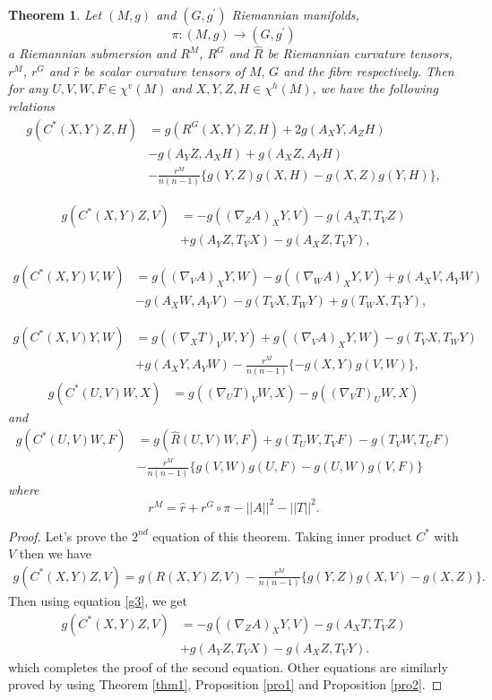 \documentclass{birkjour}
\newtheorem{theorem}{Theorem}[section]
\theoremstyle{definition}
\theoremstyle{remark}
\numberwithin{equation}{section}
\begin{document}
\begin{theorem}
	Let $(M, g)$ and $(G, g^\prime)$ Riemannian manifolds,
	$$\pi: (M, g) \to(G, g^\prime)$$
	a Riemannian submersion and $R^M$, $R^G$ and  $\hat{R}$ be Riemannian curvature tensors, $r^M$, $r^G$ and  $\hat{r}$ be scalar curvature tensors of $M, \, G$ and the fibre respectively. Then for any $U, V, W, F \in \chi^v (M)$ and $X, Y, Z, H\in  \chi^h (M)$, we have the following relations
	\begin{align*}
		g(C^*(X,Y)Z, H) &=  g(R^G (X,Y) Z , H )+ 2g (A_{X}Y, A_{Z}H )\\
		&- g (A_{Y}Z, A_{X}H )+ g (A_{X}Z, A_{Y}H )\\
		&- \frac{r^M}{n(n-1)} \Bigg\{ g(Y,Z) g(X,H)- g(X,Z) g(Y,H) \Bigg\},
	\end{align*}
	
	\begin{align*}
		g(C^*(X,Y)Z, V) &= -g((\nabla_Z A)_X Y, V) - g(A_X T, T_V Z) \\
		&+ g(A_Y Z, T_V X) - g(A_X Z, T_V Y),
	\end{align*}
	
	\begin{align*}
		g(C^*(X,Y)V, W) &= g((\nabla_V A)_X Y, W) - g((\nabla_W A)_X Y, V) + g(A_X V, A_Y W) \\
		&- g(A_X W, A_Y V)-g(T_V X, T_W Y)+ g(T_W X, T_V Y),
	\end{align*}
	
	\begin{align*}
		g(C^*(X,V)Y, W) &= g((\nabla_X T)_V W, Y) + g((\nabla_V A)_X Y, W)
		- g(T_V X, T_W Y) \\
		&+ g(A_X Y, A_Y W)-\frac{r^M}{n(n-1)} \{-g(X,Y)g(V,W)\},
	\end{align*}
	\begin{align*}
		g(C^*(U,V)W, X) &= g((\nabla_U T)_V W, X) - g((\nabla_V T)_U W, X)
	\end{align*}
	and
	\begin{align*}
		g(C^*(U,V)W, F)&= g( \hat{R} (U,V)W , F)+ g (T_{U}W, T_{V}F )- g (T_{V}W, T_{U}F) \\
		&- \frac{r^M}{n(n-1)} \Bigg\{ g(V,W)g(U,F)- g(U,W)g(V,F)\Bigg\}
	\end{align*}
	where
	\begin{equation*}
	r^M= \hat{r}+r^G \circ \pi -||A||^2- ||T||^2.
	\end{equation*}
\end{theorem}
\begin{proof}
	Let's prove the $2^{nd}$ equation of this theorem. Taking inner product $C^*$ with $V$ then we have
	\begin{align*}
		g(C^*(X,Y)Z,V) = g(R(X,Y)Z,V) -\frac{r^M}{n(n-1)} \{g(Y,Z)g(X,V)-g(X,Z)\}.
	\end{align*}
	Then using equation \eqref{g3}, we get
	\begin{align*}
		g(C^*(X,Y)Z,V)&=-g((\nabla_Z A)_X Y,V)- g(A_X T, T_V Z) \\
		&+g(A_Y Z, T_V X)- g(A_X Z, T_V Y).
	\end{align*}
which completes the proof of the second equation. Other equations are similarly proved by using Theorem \ref{thm1}, Proposition \ref{pro1} and Proposition \ref{pro2}.
\end{proof}
\end{document}
